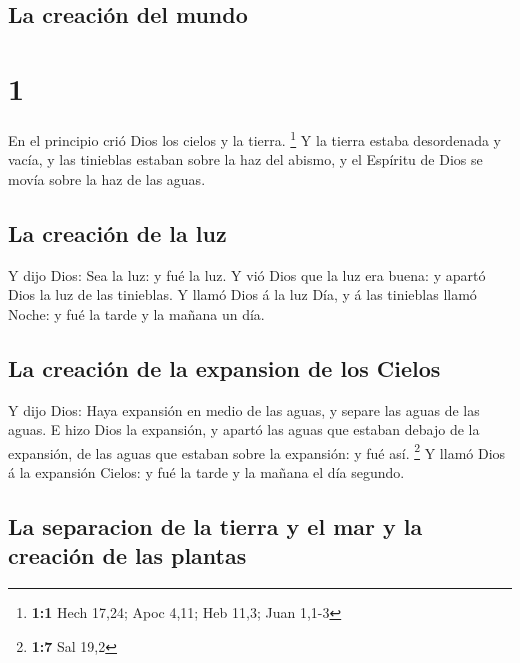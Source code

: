 \hypertarget{la-creaciuxf3n-del-mundo}{%
\subsection{La creación del mundo}\label{la-creaciuxf3n-del-mundo}}

\hypertarget{section}{%
\section{1}\label{section}}

 En el principio crió Dios los cielos y la tierra.
\footnote{\textbf{1:1} Hech 17,24; Apoc 4,11; Heb 11,3; Juan 1,1-3}
 Y la tierra estaba desordenada y vacía, y las tinieblas
estaban sobre la haz del abismo, y el Espíritu de Dios se movía sobre la
haz de las aguas.

\hypertarget{la-creaciuxf3n-de-la-luz}{%
\subsection{La creación de la luz}\label{la-creaciuxf3n-de-la-luz}}

 Y dijo Dios: Sea la luz: y fué la luz.  Y vió
Dios que la luz era buena: y apartó Dios la luz de las tinieblas.
 Y llamó Dios á la luz Día, y á las tinieblas llamó Noche: y
fué la tarde y la mañana un día.

\hypertarget{la-creaciuxf3n-de-la-expansion-de-los-cielos}{%
\subsection{La creación de la expansion de los
Cielos}\label{la-creaciuxf3n-de-la-expansion-de-los-cielos}}

 Y dijo Dios: Haya expansión en medio de las aguas, y separe
las aguas de las aguas.  E hizo Dios la expansión, y apartó
las aguas que estaban debajo de la expansión, de las aguas que estaban
sobre la expansión: y fué así. \footnote{\textbf{1:7} Sal 19,2}
 Y llamó Dios á la expansión Cielos: y fué la tarde y la
mañana el día segundo.

\hypertarget{la-separacion-de-la-tierra-y-el-mar-y-la-creaciuxf3n-de-las-plantas}{%
\subsection{La separacion de la tierra y el mar y la creación de las
plantas}\label{la-separacion-de-la-tierra-y-el-mar-y-la-creaciuxf3n-de-las-plantas}}

